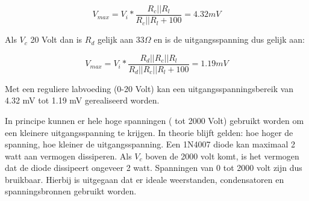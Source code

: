 \documentclass{report}
\begin{document}
$$
\label{eq:maximaalVoltage}
V_{max} = V_i * \frac{R_c||R_l}{R_c||R_l + 100} = 4.32 mV
$$

Als $V_c$ 20 Volt dan is $R_d$ gelijk aan $33\Omega$ en is de uitgangsspanning dus gelijk aan: 

$$
\label{eq:maximaalVoltage}
V_{max} = V_i * \frac{R_d||R_c||R_l}{R_d||R_c||R_l + 100} = 1.19 mV
$$

Met een reguliere labvoeding (0-20 Volt) kan een uitgangsspanningsbereik van 4.32 mV tot 1.19 mV gerealiseerd worden. 

In principe kunnen er hele hoge spanningen ( tot 2000 Volt) gebruikt worden om een kleinere uitgangsspanning te krijgen. In theorie blijft gelden: hoe hoger de spanning, hoe kleiner de uitgangsspanning. Een 1N4007 diode kan maximaal 2 watt aan vermogen dissiperen. Als $V_c$ boven de 2000 volt komt, is het vermogen dat de diode dissipeert ongeveer 2 watt. Spanningen van 0 tot 2000 volt zijn dus bruikbaar. Hierbij is uitgegaan dat er ideale weerstanden, condensatoren en spanningsbronnen gebruikt worden.
\end{document}

